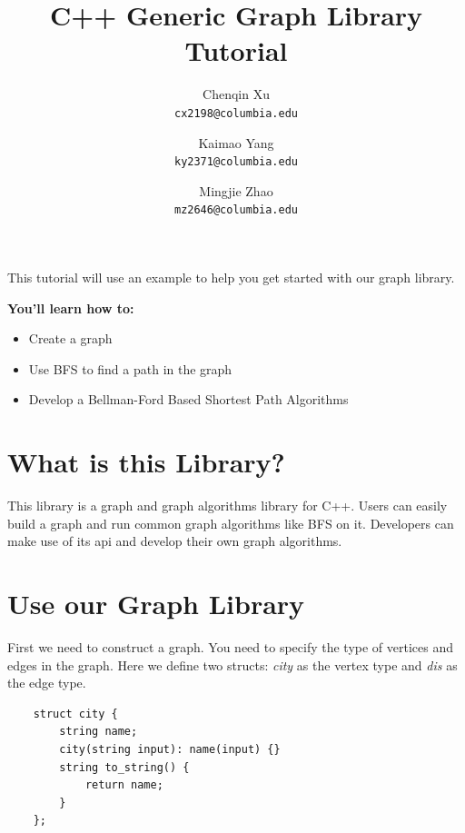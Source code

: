 \documentclass{article}
\title{C++ Generic Graph Library Tutorial}
\author{Chenqin Xu\\
	{\tt\small cx2198@columbia.edu}
	\and
	Kaimao Yang\\
	{\tt\small ky2371@columbia.edu}
	\and
	Mingjie Zhao\\
	{\tt\small mz2646@columbia.edu}
}
\begin{document}
    \maketitle

    \tableofcontents
    \newpage
    This tutorial will use an example to help you get started with our graph library. 
    
    \textbf{You'll learn how to:}
    \begin{itemize}
    	\item Create a graph
    	\item Use BFS to find a path in the graph
    	\item Develop a Bellman-Ford Based Shortest Path Algorithms
    \end{itemize}

	\section{What is this Library?}
	This library is a graph and graph algorithms library for C++. Users can easily build a graph and run common graph algorithms like BFS on it. Developers can make use of its api and develop their own graph algorithms. 

    \section {Use our Graph Library}
    First we need to construct a graph. You need to specify the type of vertices and edges in the graph. Here we define two structs: \textit{city} as the vertex type and \textit{dis} as the edge type.
    \begin{lstlisting}
    struct city {
	    string name;
	    city(string input): name(input) {} 
	    string to_string() {
	    	return name;
	    }
    };
    \end{lstlisting}
    
\end{document}
